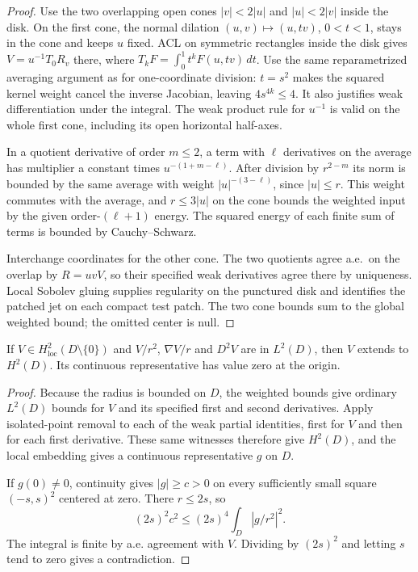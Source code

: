 \begin{proof}
\leanok
Use the two overlapping open cones $|v|<2|u|$ and $|u|<2|v|$
inside the disk. On the first cone, the normal dilation
$(u,v)\mapsto(u,tv)$, $0<t<1$, stays in the cone and keeps $u$ fixed.
ACL on symmetric rectangles inside the disk gives
$V=u^{-1}T_0R_v$ there, where $T_kF=\int_0^1t^k F(u,tv)\,dt$.
Use the same reparametrized averaging argument as for one-coordinate
division: $t=s^2$ makes the squared kernel weight cancel the inverse
Jacobian, leaving $4s^{4k}\le4$. It also justifies weak differentiation
under the integral. The weak product rule for $u^{-1}$ is valid on the
whole first cone, including its open horizontal half-axes.

In a quotient derivative of order $m\le2$, a term with $\ell$ derivatives
on the average has multiplier a constant times $u^{-(1+m-\ell)}$.
After division by $r^{2-m}$ its norm is bounded by the same average with
weight $|u|^{-(3-\ell)}$, since $|u|\le r$. This weight commutes with the
average, and $r\le3|u|$ on the cone bounds the weighted input by the
given order-$(\ell+1)$ energy. The squared energy of each finite sum of
terms is bounded by Cauchy--Schwarz.

Interchange coordinates for the other cone. The two quotients agree
a.e.\ on the overlap by $R=uvV$, so their specified weak derivatives
agree there by uniqueness. Local Sobolev gluing supplies regularity on
the punctured disk and identifies the patched jet on each compact test
patch. The two cone bounds sum to the global weighted bound; the omitted
center is null.
\end{proof}

\begin{lemma}
\label{lem:weighted-h2-point-removal}
\leanok
If $V\in H^2_{\mathrm{loc}}(D\setminus\{0\})$ and
$V/r^2$, $\nabla V/r$ and $D^2V$ are in $L^2(D)$, then $V$ extends
to $H^2(D)$. Its continuous representative has value zero at the origin.
\end{lemma}

\begin{proof}
\leanok
Because the radius is bounded on $D$, the weighted bounds give ordinary
$L^2(D)$ bounds for $V$ and its specified first and second derivatives.
Apply isolated-point removal to each of the weak partial identities,
first for $V$ and then for each first derivative. These same witnesses
therefore give $H^2(D)$, and the local embedding gives a continuous
representative $g$ on $D$.

If $g(0)\ne 0$, continuity gives $|g|\ge c>0$ on every sufficiently
small square $(-s,s)^2$ centered at zero. There $r\le 2s$, so
\[
 (2s)^2 c^2 \le (2s)^4\int_D |g/r^2|^2.
\]
The integral is finite by a.e. agreement with $V$. Dividing by $(2s)^2$
and letting $s$ tend to zero gives a contradiction.
\end{proof}

